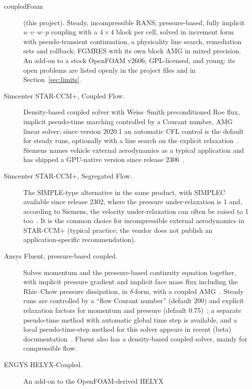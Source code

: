 \begin{description}
\item[coupledFoam] (this project). Steady, incompressible RANS; pressure-based,
  fully implicit $u$--$v$--$w$--$p$ coupling with a $4\times4$ block per
  cell, solved in increment form with pseudo-transient continuation, a
  physicality line search, remediation sets and rollback; FGMRES with its
  own block AMG in mixed precision. An add-on to a stock OpenFOAM v2606,
  GPL-licensed, and young: its open problems are listed openly in the
  project files and in Section~\ref{sec:limits}.
\item[Simcenter STAR-CCM+, Coupled Flow.] Density-based coupled solver with
  Weiss--Smith preconditioned Roe flux, implicit pseudo-time marching
  controlled by a Courant number, AMG linear solver; since version 2020.1
  an automatic CFL control is the default for steady runs, optionally with
  a line search on the explicit relaxation~\cite{cmp-StarCoupledDoc,
  cmp-StarAutoCFL2020,cmp-StarEffortless2020}. Siemens names vehicle
  external aerodynamics as a typical application and has shipped a
  GPU-native version since release 2306~\cite{cmp-StarCoupledGPU2023}.
\item[Simcenter STAR-CCM+, Segregated Flow.] The SIMPLE-type alternative
  in the same product, with SIMPLEC available since release 2302, where
  the pressure under-relaxation is 1 and, according to Siemens, the
  velocity under-relaxation can often be raised to 1
  too~\cite{cmp-StarSIMPLEC2023}. It is the common choice for
  incompressible external aerodynamics in STAR-CCM+ (typical practice; the
  vendor does not publish an application-specific recommendation).
\item[Ansys Fluent, pressure-based coupled.] Solves momentum and the
  pressure-based continuity equation together, with implicit pressure
  gradient and implicit face mass flux including the Rhie--Chow pressure
  dissipation, in $\delta$-form, with a coupled AMG~\cite{cmp-Fluent12TG,
  cmp-ChenPrzekwas2010}. Steady runs are controlled by a ``flow Courant
  number'' (default 200) and explicit relaxation factors for momentum and
  pressure (default 0.75)~\cite{cmp-Fluent12UG}; a separate pseudo-time
  method with automatic global time step is available, and a local
  pseudo-time-step method for this solver appears in recent (beta)
  documentation~\cite{cmp-FluentPseudoTime,cmp-FluentLocalPseudo}. Fluent
  also has a density-based coupled solver, mainly for compressible flow.
\item[ENGYS HELYX-Coupled.] An add-on to the OpenFOAM-derived HELYX

\end{description}
